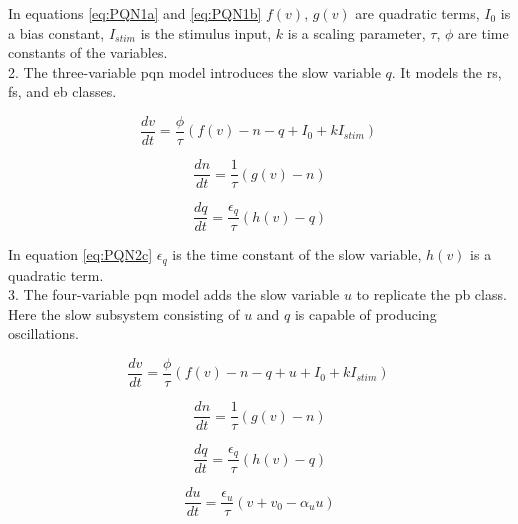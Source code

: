 In equations \ref{eq:PQN1a} and \ref{eq:PQN1b} \(f(v)\), \(g(v)\) are quadratic terms,
\(I_{0}\) is a bias constant,
\(I_{stim}\) is the stimulus input,
\(k\) is a scaling parameter,
\(\tau\), \(\phi\) are time constants of the variables.\\

2. The three-variable \acrshort{pqn} model introduces the slow variable $q$. It models the \acrshort{rs}, \acrshort{fs}, and \acrshort{eb} classes.

\begin{equation}
    \frac{dv}{dt}=\frac{\phi}{\tau}\left(f\left(v\right)-n-q+I_0+kI_{stim}\right)\ 
    \label{eq:PQN2a}
\end{equation}

\begin{equation}
    \frac{dn}{dt}=\frac{1}{\tau}(g\left(v\right)-n)    
    \label{eq:PQN2b}
\end{equation}

\begin{equation}
    \frac{dq}{dt}=\frac{\epsilon_q}{\tau}(h\left(v\right)-q)
    \label{eq:PQN2c}
\end{equation}

In equation \ref{eq:PQN2c} \(\epsilon_q\) is the time constant of the slow variable,
\(h(v)\) is a quadratic term.\\

3. The four-variable \acrshort{pqn} model adds the slow variable $u$ to replicate the \acrshort{pb} class. Here the slow subsystem consisting of $u$ and $q$ is capable of producing oscillations.

\begin{equation}
    \frac{dv}{dt}=\frac{\phi}{\tau}\left(f\left(v\right)-n-q+u+I_0+kI_{stim}\right)\ 
    \label{eq:PQN3a}
\end{equation}

\begin{equation}
    \frac{dn}{dt}=\frac{1}{\tau}(g\left(v\right)-n)
    \label{eq:PQN3b}
\end{equation}

\begin{equation}
    \frac{dq}{dt}=\frac{\epsilon_q}{\tau}(h\left(v\right)-q)
    \label{eq:PQN3c}
\end{equation}

\begin{equation}
    \frac{du}{dt}=\frac{\epsilon_u}{\tau}(v+v_0-\alpha_uu)
    \label{eq:PQN3d}
\end{equation}

